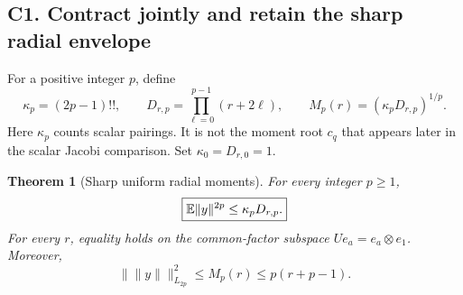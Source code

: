 \documentclass[11pt]{article}
\numberwithin{equation}{section}
\newtheorem{theorem}{Theorem}[section]
\theoremstyle{definition}\newtheorem{definition}[theorem]{Definition}
\theoremstyle{remark}\newtheorem{remark}[theorem]{Remark}
\newcommand{\norm}[1]{\lVert#1\rVert}\newcommand{\ip}[2]{\langle#1,#2\rangle}
\begin{document}
\subsection{C1. Contract jointly and retain the sharp radial envelope}\label{c:sec:wick-radial}
For a positive integer $p$, define
\begin{equation}\label{c:eq:wick-parameters}
 \kappa_p=(2p-1)!!,\qquad
 D_{r,p}=\prod_{\ell=0}^{p-1}(r+2\ell),\qquad
 M_p(r)=(\kappa_pD_{r,p})^{1/p}.
\end{equation}
Here $\kappa_p$ counts scalar pairings. It is not the moment root $c_q$ that
appears later in the scalar Jacobi comparison. Set $\kappa_0=D_{r,0}=1$.

\begin{theorem}[Sharp uniform radial moments]\label{c:thm:wick-radial}
For every integer $p\ge1$,
\begin{equation}\label{c:eq:wick-radial}
 \boxed{\E\norm y^{2p}\le \kappa_pD_{r,p}.}
\end{equation}
For every $r$, equality holds on the common-factor subspace $Ue_a=e_a\otimes e_1$. Moreover,
\begin{equation}\label{c:eq:wick-amgm}
 \norm{\norm y}_{L_{2p}}^2\le M_p(r)\le p(r+p-1).
\end{equation}
\end{theorem}
\end{document}
